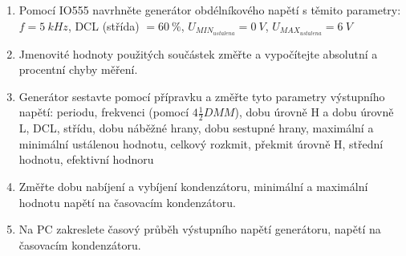 \begin{minipage}[H][9cm][c]{0.8\textwidth}
  \begin{enumerate}
    \item
      Pomocí IO555 navrhněte generátor obdélníkového napětí s těmito parametry:
      \newline
      $f = 5~kHz$, DCL (střída) $= 60~\%$, $U_{MIN_{ustalena}} = 0~V$, $U_{MAX_{ustalena}} = 6~V$
    \item
      Jmenovité hodnoty použitých součástek změřte a vypočítejte absolutní a procentní chyby měření.
    \item
      Generátor sestavte pomocí přípravku a změřte tyto parametry výstupního napětí:
      \newline
      periodu, frekvenci (pomocí $4\frac{1}{2} DMM$), dobu úrovně H a dobu úrovně L, DCL, střídu, dobu náběžné hrany, dobu sestupné hrany, maximální a minimální ustálenou hodnotu, celkový rozkmit, překmit úrovně H, střední hodnotu, efektivní hodnoru
    \item
      Změřte dobu nabíjení a vybíjení kondenzátoru, minimální a maximální hodnotu napětí na časovacím kondenzátoru.
    \item
      Na PC zakreslete časový průběh výstupního napětí generátoru, napětí na časovacím kondenzátoru.  
  \end{enumerate}

\end{minipage}


